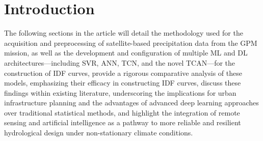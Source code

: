 \section{Introduction}



\vspace{1em}



\vspace{1em}



\vspace{1em}



\vspace{1em}



\vspace{1em}

The following sections in the article will detail the methodology used for the acquisition and preprocessing of satellite-based precipitation data from the GPM mission, as well as the development and configuration of multiple ML and DL architectures—including SVR, ANN, TCN, and the novel TCAN—for the construction of IDF curves, provide a rigorous comparative analysis of these models, emphasizing their efficacy in constructing IDF curves, discuss these findings within existing literature, underscoring the implications for urban infrastructure planning and the advantages of advanced deep learning approaches over traditional statistical methods, and highlight the integration of remote sensing and artificial intelligence as a pathway to more reliable and resilient hydrological design under non-stationary climate conditions.